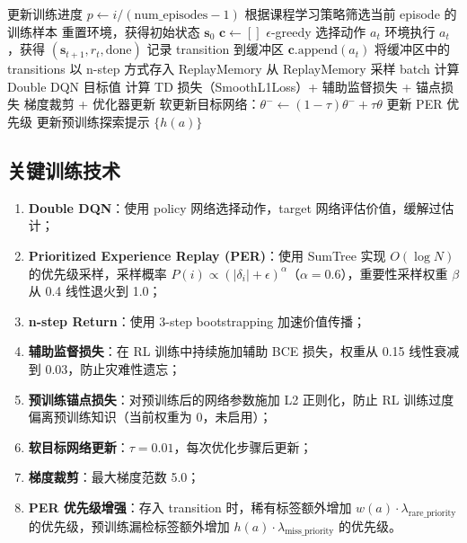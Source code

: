 \documentclass[12pt,a4paper]{article}
\newcommand{\selected}{\mathbf{c}}
\begin{document}
\begin{algorithm}[H]
\caption{DQN 主训练循环（单次迭代）}
\begin{algorithmic}[1]
    \State 更新训练进度 $p \gets i / (\text{num\_episodes}-1)$
    \State 根据课程学习策略筛选当前 episode 的训练样本
        \State 重置环境，获得初始状态 $\mathbf{s}_0$
        \State $\selected \gets []$
        \Repeat
            \State $\epsilon$-greedy 选择动作 $a_t$
            \State 环境执行 $a_t$，获得 $(\mathbf{s}_{t+1}, r_t, \text{done})$
            \State 记录 transition 到缓冲区
                \State $\selected.\text{append}(a_t)$
            \EndIf
        \State 将缓冲区中的 transitions 以 n-step 方式存入 ReplayMemory
            \State 从 ReplayMemory 采样 batch
            \State 计算 Double DQN 目标值
            \State 计算 TD 损失（SmoothL1Loss）+ 辅助监督损失 + 锚点损失
            \State 梯度裁剪 + 优化器更新
            \State 软更新目标网络：$\theta^- \gets (1-\tau)\theta^- + \tau\theta$
            \State 更新 PER 优先级
        \EndWhile
    \EndFor
        \State 更新预训练探索提示 $\{h(a)\}$
    \EndIf
\EndFor
\end{algorithmic}
\end{algorithm}

\subsection{关键训练技术}

\begin{enumerate}[label=(\arabic*)]
    \item \textbf{Double DQN}：使用 policy 网络选择动作，target 网络评估价值，缓解过估计；
    \item \textbf{Prioritized Experience Replay (PER)}：使用 SumTree 实现 $O(\log N)$ 的优先级采样，采样概率 $P(i) \propto (|\delta_i| + \epsilon)^\alpha$（$\alpha=0.6$），重要性采样权重 $\beta$ 从 0.4 线性退火到 1.0；
    \item \textbf{n-step Return}：使用 3-step bootstrapping 加速价值传播；
    \item \textbf{辅助监督损失}：在 RL 训练中持续施加辅助 BCE 损失，权重从 0.15 线性衰减到 0.03，防止灾难性遗忘；
    \item \textbf{预训练锚点损失}：对预训练后的网络参数施加 L2 正则化，防止 RL 训练过度偏离预训练知识（当前权重为 0，未启用）；
    \item \textbf{软目标网络更新}：$\tau = 0.01$，每次优化步骤后更新；
    \item \textbf{梯度裁剪}：最大梯度范数 5.0；
    \item \textbf{PER 优先级增强}：存入 transition 时，稀有标签额外增加 $w(a) \cdot \lambda_{\text{rare\_priority}}$ 的优先级，预训练漏检标签额外增加 $h(a) \cdot \lambda_{\text{miss\_priority}}$ 的优先级。
\end{enumerate}
\end{document}
